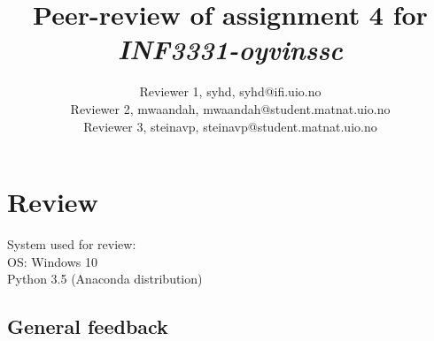 \documentclass[a4paper]{article}
\title{Peer-review of assignment 4 for \textit{INF3331-oyvinssc}}
\author{Reviewer 1, syhd, syhd@ifi.uio.no \\
 		Reviewer 2, mwaandah, mwaandah@student.matnat.uio.no \\
		Reviewer 3, steinavp, steinavp@student.matnat.uio.no}
\begin{document}
\maketitle

\section{Review}\label{sec:review}

System used for review:
\\OS: Windows 10
\\Python 3.5 (Anaconda distribution)

\subsection*{General feedback}
\end{document}
